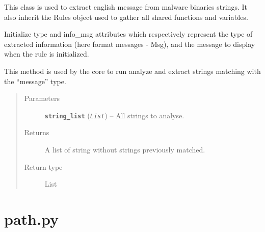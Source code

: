 \documentclass[letterpaper,10pt,oneside]{sphinxmanual}
\begin{document}
\begin{fulllineitems}
\label{index:lib.allRules.message.Msg}
This class is used to extract english message from malware
binaries strings. It also inherit the Rules object used to gather
all shared functions and variables.

\begin{fulllineitems}
\label{index:lib.allRules.message.Msg.__init__}
Initialize type and info\_msg attributes which respectively represent
the type of extracted information (here format messages - Msg),
and the message to display when the rule is initialized.

\end{fulllineitems}


\begin{fulllineitems}
\label{index:lib.allRules.message.Msg.run_analysis}
This method is used by the core to run analyze and extract strings
matching with the ``message'' type.
\begin{quote}\begin{description}
\item[{Parameters}] \leavevmode
\textbf{\texttt{string\_list}} (\emph{\texttt{List}}) -- All strings to analyse.

\item[{Returns}] \leavevmode
A list of string without strings previously matched.

\item[{Return type}] \leavevmode
List

\end{description}\end{quote}

\end{fulllineitems}


\end{fulllineitems}



\section{path.py}
\label{index:module-lib.allRules.path}\label{index:path-py}
\end{document}
